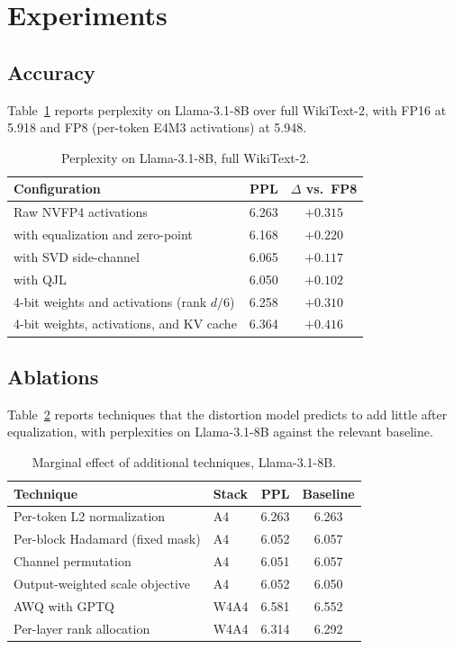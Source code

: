 \documentclass[11pt]{article}
\begin{document}
\section{Experiments}\label{sec:exp}

\subsection{Accuracy}
Table~\ref{tab:acc} reports perplexity on Llama-3.1-8B over full WikiText-2, with FP16
at 5.918 and FP8 (per-token E4M3 activations) at 5.948.

\begin{table}[h]\centering\small
\caption{Perplexity on Llama-3.1-8B, full WikiText-2.}\label{tab:acc}
\begin{tabular}{lcc}
\toprule
Configuration & PPL & $\Delta$ vs.\ FP8 \\
\midrule
Raw NVFP4 activations & 6.263 & $+0.315$ \\
\;with equalization and zero-point & 6.168 & $+0.220$ \\
\;with SVD side-channel & 6.065 & $+0.117$ \\
\;with QJL & 6.050 & $+0.102$ \\
\midrule
4-bit weights and activations (rank $d/6$) & 6.258 & $+0.310$ \\
4-bit weights, activations, and KV cache & 6.364 & $+0.416$ \\
\bottomrule
\end{tabular}
\end{table}

\subsection{Ablations}
Table~\ref{tab:abl} reports techniques that the distortion model predicts to add little
after equalization, with perplexities on Llama-3.1-8B against the relevant baseline.

\begin{table}[h]\centering\small
\caption{Marginal effect of additional techniques, Llama-3.1-8B.}\label{tab:abl}
\begin{tabular}{llcc}
\toprule
Technique & Stack & PPL & Baseline \\
\midrule
Per-token L2 normalization & A4 & 6.263 & 6.263 \\
Per-block Hadamard (fixed mask) & A4 & 6.052 & 6.057 \\
Channel permutation & A4 & 6.051 & 6.057 \\
Output-weighted scale objective & A4 & 6.052 & 6.050 \\
AWQ with GPTQ & W4A4 & 6.581 & 6.552 \\
Per-layer rank allocation & W4A4 & 6.314 & 6.292 \\
\bottomrule
\end{tabular}
\end{table}
\end{document}
